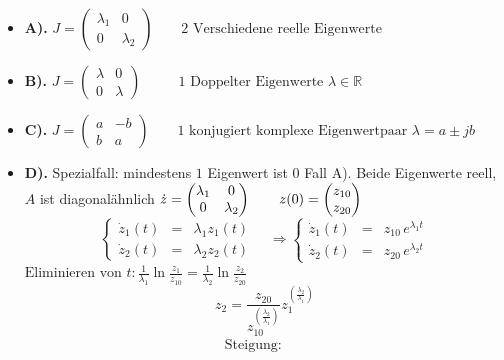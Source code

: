 \documentclass[ngerman]{tudscrreprt}
\begin{document}
\begin{itemize}
\item \textbf{A).} 
$J=
\begin{pmatrix}
\lambda_1 & 0\\
0 & \lambda_2
\end{pmatrix} \qquad \text{2 Verschiedene reelle Eigenwerte}
$
\item\textbf{B).} 
$J=
\begin{pmatrix}
\lambda & 0\\
0 & \lambda
\end{pmatrix} \qquad \text{~~1 Doppelter Eigenwerte } \lambda \in \mathbb{R} 
$
\item\textbf{C).} 
$J=
\begin{pmatrix}
a & -b\\
b & a
\end{pmatrix} \qquad \text{1 konjugiert komplexe Eigenwertpaar } \lambda = a \pm jb 
$
\item\textbf{D).} Spezialfall: 
mindestens $1$ Eigenwert ist $0$ Fall A). Beide Eigenwerte reell, $A$ ist diagonalähnlich 
$ 
\dot z=
\begin{pmatrix}
\lambda_1 & 0\\
0 & \lambda_2
\end{pmatrix} \qquad 
z(0)=
\begin{pmatrix}
z_{10}\\
z_{20}
\end{pmatrix}\\
$ 
\begin{equation}
\boxed{\left\{
\begin{matrix}
\dot z_1(t) &=& \lambda_1 z_1(t)\\
\dot z_2(t) &=& \lambda_2 z_2(t)
\end{matrix}
\right. }
\quad
\Rightarrow 
\boxed{\left\{
\begin{matrix}
\dot z_1(t) &=& z_{10} \,e^{\lambda_1 t}\\
\dot z_2(t) &=& z_{20} \,e^{\lambda_2 t}
\end{matrix}
\right.
}
\tag{2.2}
\end{equation}
$ 
\text{Eliminieren von } t:
\frac{1}{\lambda_1} \ln{ \frac{z_1}{z_{10}}} = \frac{1}{\lambda_2} \ln{ \frac{z_2}{z_{20}}}\qquad
$ 
\begin{equation}
\boxed{z_2 = \frac{z_{20}}{z_{10}^{(\frac{\lambda_2}{\lambda_1} )}} z_1^{(\frac{\lambda_2}{\lambda_1})}
}
\tag{2.3}
\end{equation}
\begin{align}
\boxed{\text{ Steigung:}\qquad
}
\end{align}
\end{itemize}
\end{document}
